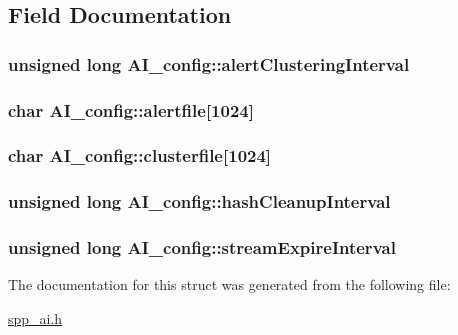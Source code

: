 \subsection{Field Documentation}
\hypertarget{structAI__config_a7d0d098b8263aa3d8415b11d1ec7f93d}{
\subsubsection[{alertClusteringInterval}]{\setlength{\rightskip}{0pt plus 5cm}unsigned long {\bf AI\_\-config::alertClusteringInterval}}}
\label{structAI__config_a7d0d098b8263aa3d8415b11d1ec7f93d}
\hypertarget{structAI__config_a2efa9590d7eea6dce8b5dd9aa76ed8ca}{
\subsubsection[{alertfile}]{\setlength{\rightskip}{0pt plus 5cm}char {\bf AI\_\-config::alertfile}\mbox{[}1024\mbox{]}}}
\label{structAI__config_a2efa9590d7eea6dce8b5dd9aa76ed8ca}
\hypertarget{structAI__config_a6da02a3f7116fd3810a41b738e8883a3}{
\subsubsection[{clusterfile}]{\setlength{\rightskip}{0pt plus 5cm}char {\bf AI\_\-config::clusterfile}\mbox{[}1024\mbox{]}}}
\label{structAI__config_a6da02a3f7116fd3810a41b738e8883a3}
\hypertarget{structAI__config_a9f7680615027d4fb74b4aa144a7028a4}{
\subsubsection[{hashCleanupInterval}]{\setlength{\rightskip}{0pt plus 5cm}unsigned long {\bf AI\_\-config::hashCleanupInterval}}}
\label{structAI__config_a9f7680615027d4fb74b4aa144a7028a4}
\hypertarget{structAI__config_abbe77d5f94b8c5164bea47acba09c98b}{
\subsubsection[{streamExpireInterval}]{\setlength{\rightskip}{0pt plus 5cm}unsigned long {\bf AI\_\-config::streamExpireInterval}}}
\label{structAI__config_abbe77d5f94b8c5164bea47acba09c98b}


The documentation for this struct was generated from the following file:\begin{DoxyCompactItemize}
\item 
\hyperlink{spp__ai_8h}{spp\_\-ai.h}\end{DoxyCompactItemize}
